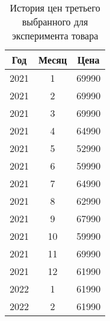 \documentclass{bmstu}
\begin{document}
\begin{table}[H]
	\caption{История цен третьего выбранного для эксперимента товара}
	\begin{center}
		\begin{tabular}{| c | c | c |} 
			\hline
			
			\textbf{Год} & \textbf{Месяц} & \textbf{Цена} \\  
			
			\hline
			
			2021 & 1 & 69990 \\
			
			\hline
			
			2021 & 2 & 69990 \\
			
			\hline
			
			2021 & 3 & 69990 \\
			
			\hline
			
			2021 & 4 & 64990 \\
			
			\hline
			
			2021 & 5 & 52990 \\
			
			\hline
			
			2021 & 6 & 59990 \\
			
			\hline
			
			2021 & 7 & 64990 \\
			
			\hline
			
			2021 & 8 & 62990 \\
			
			\hline
			
			2021 & 9 & 67990 \\
			
			\hline
			
			2021 & 10 & 59990 \\
			
			\hline
			
			2021 & 11 & 69990 \\
			
			\hline
			
			2021 & 12 & 61990 \\
			
			\hline
			
			2022 & 1 & 61990 \\
			
			\hline
			
			2022 & 2 & 61990 \\
			

\end{tabular}
\end{center}
\end{table}
\end{document}
